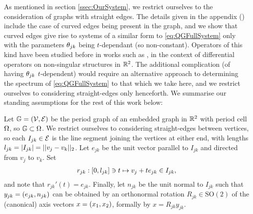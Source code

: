 As mentioned in section \ref{ssec:OurSystem}, we restrict ourselves to the consideration of graphs with straight edges.
The details given in the appendix () include the case of curved edges being present in the graph, and we show that curved edges give rise to systems of a similar form to \eqref{eq:QGFullSystem} only with the parameters $\theta_{jk}$ being $t$-dependant (so non-constant).
Operators of this kind have been studied before in works such as , in the context of differential operators on non-singular structures in $\mathbb{R}^2$.
The additional complication (of having $\theta_{jk}$ $t$-dependent) would require an alternative approach to determining the spectrum of \eqref{eq:QGFullSystem} to that which we take here, and we restrict ourselves to considering straight-edges only henceforth.
We summarise our standing assumptions for the rest of this work below:
\begin{assumption} \label{ass:MeasTheoryProblemSetup}
	Let $\mathbb{G}=\left( \mathcal{V},\mathcal{E} \right)$ be the period graph of an embedded graph in $\mathbb{R}^2$ with period cell $\Omega$, so $\mathbb{G}\subset\Omega$.
	We restrict ourselves to considering straight-edges between vertices, so each $I_{jk}\in \mathcal{E}$ is the line segment joining the vertices at either end, with lengths $l_{jk} = \left\lvert I_{jk} \right\rvert = \lvert\lvert v_j-v_k \rvert\rvert_2$.
	Let $e_{jk}$ be the unit vector parallel to $I_{jk}$ and directed from $v_j$ to $v_k$.
	Set
	\begin{align} \label{eq:EdgeParameterisation}
	r_{jk}:\left[ 0, l_{jk} \right] \ni t \mapsto v_j + te_{jk} \in I_{jk},
	\end{align}
	and note that $r_{jk}'(t) = e_{jk}$.
	Finally, let $n_{jk}$ be the unit normal to $I_{jk}$ such that $y_{jk} = \left( e_{jk}, n_{jk} \right)$ can be obtained by an orthonormal rotation $R_{jk}\in\mathrm{SO}(2)$ of the (canonical) axis vectors $x = \left( x_1, x_2 \right)$, formally by $x = R_{jk}y_{jk}$.
\end{assumption}

